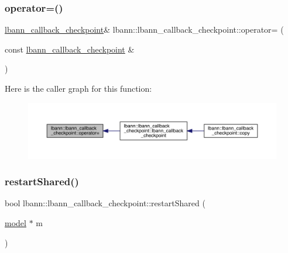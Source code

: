 \mbox{\label{classlbann_1_1lbann__callback__checkpoint_aab65cb67b53e6af00142a9dc665f9ce8}} 
\subsubsection{\texorpdfstring{operator=()}{operator=()}}
{\footnotesize\ttfamily \hyperlink{classlbann_1_1lbann__callback__checkpoint}{lbann\+\_\+callback\+\_\+checkpoint}\& lbann\+::lbann\+\_\+callback\+\_\+checkpoint\+::operator= (\begin{DoxyParamCaption}\item[{const \hyperlink{classlbann_1_1lbann__callback__checkpoint}{lbann\+\_\+callback\+\_\+checkpoint} \&}]{ }\end{DoxyParamCaption})\hspace{0.3cm}{\ttfamily [default]}}

Here is the caller graph for this function\+:\nopagebreak
\begin{figure}[H]
\begin{center}
\leavevmode
\includegraphics[width=350pt]{classlbann_1_1lbann__callback__checkpoint_aab65cb67b53e6af00142a9dc665f9ce8_icgraph}
\end{center}
\end{figure}
\mbox{\label{classlbann_1_1lbann__callback__checkpoint_a40d369278bc5963ba2f3cca1750ba004}} 
\subsubsection{\texorpdfstring{restart\+Shared()}{restartShared()}}
{\footnotesize\ttfamily bool lbann\+::lbann\+\_\+callback\+\_\+checkpoint\+::restart\+Shared (\begin{DoxyParamCaption}\item[{\hyperlink{classlbann_1_1model}{model} $\ast$}]{m }\end{DoxyParamCaption})}



